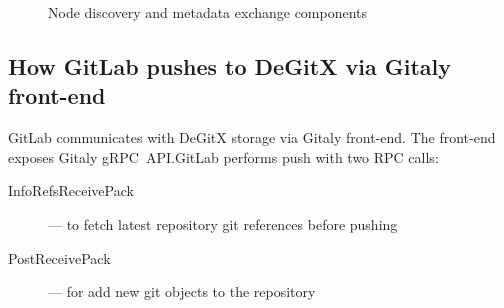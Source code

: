 \begin{figure}
  \begin{center}
  \end{center}
  \caption{Node discovery and metadata exchange components}
  \label{fig:ex-node-lookup}
\end{figure}

\subsection{How GitLab pushes to DeGitX via Gitaly front-end}

GitLab communicates with DeGitX storage via Gitaly front-end. The front-end
exposes Gitaly gRPC~API.\@ GitLab performs push with two RPC calls:
\begin{description}
  \item[InfoRefsReceivePack] --- to fetch latest repository git references before pushing
  \item[PostReceivePack] --- for add new git objects to the repository
\end{description}


